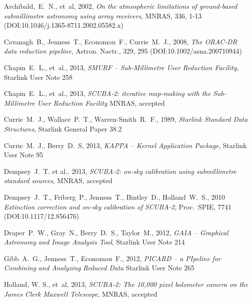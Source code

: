 \documentclass[twoside,11pt]{article}
\newcommand{\htmladdnormallink}[2]{#1}
\newcommand{\xref}[3]{#1}
\renewcommand{\_}{\texttt{\symbol{95}}}
\begin{document}
\begin{thebibliography}{}

Archibald,~E.~N., et~al, 2002, \htmladdnormallink{\textit{On the atmospheric limitations
of ground-based submillimetre astronomy using array receivers}}{
http://dx.doi.org/10.1046/j.1365-8711.2002.05582.x}, MNRAS, 336, 1-13
(DOI:10.1046/j.1365-8711.2002.05582.x)

Cavanagh~B., Jenness~T., Economou~F., Currie~M.~J., 2008,
\htmladdnormallink{\textit{The ORAC-DR data reduction
pipeline}}{http://dx.doi.org/10.1002/asna.200710944}, Astron. Nactr., 329, 295
(DOI:10.1002/asna.200710944)

Chapin~E.~L., et~al., 2013, \textit{SMURF -- Sub-Millimetre User Reduction
Facility}, \xref{Starlink User Note 258}{sun258}{}

Chapin~E.~L., et~al., 2013, \textit{SCUBA-2: iterative map-making with the
Sub-Millimetre User Reduction Facility} MNRAS,
\htmladdnormallink{accepted}{http://arxiv.org/abs/1301.3652}

Currie~M.~J., Wallace~P.~T., Warren-Smith~R.~F., 1989,
\textit{Starlink Standard Data Structures}, \xref{Starlink General
Paper 38.2}{sgp38}{}

Currie~M.~J., Berry~D.~S, 2013, \textit{KAPPA -- Kernel Application Package},
\xref{Starlink User Note 95}{sun95}{}

Dempsey~J.~T. et al., 2013, \textit{SCUBA-2: on-sky calibration using
submillimetre standard sources}, MNRAS,
\htmladdnormallink{accepted}{http://arxiv.org/abs/1301.3773}

Dempsey~J.~T., Friberg~P., Jenness~T., Bintley~D., Holland~W.~S., 2010
\htmladdnormallink{\textit{Extinction correction and on-sky calibration of
SCUBA-2}}{http://dx.doi.org/10.1117/12.856476},
Proc.\ SPIE, 7741 (DOI:10.1117/12.856476)

Draper~P.~W., Gray~N., Berry~D.~S., Taylor~M., 2012,
\textit{GAIA -- Graphical Astronomy and Image Analysis Tool},
\xref{Starlink User Note 214}{sun214}{}

Gibb~A.~G., Jenness~T., Economou~F., 2012, \textit{PICARD -- a
PIpeline for Combining and Analyzing Reduced Data}
\xref{Starlink User Note 265}{sun265}{}

Holland, W. S., et~al, 2013, \textit{SCUBA-2: The 10,000 pixel bolometer
camera on the James Clerk Maxwell Telescope}, MNRAS,
\htmladdnormallink{accepted}{http://arxiv.org/abs/1301.3650}


\end{thebibliography}
\end{document}
